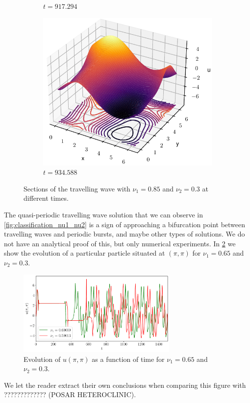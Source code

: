 \documentclass[twoside]{article}
\begin{document}
\begin{figure}[ht]
\begin{subfigure}[b]{0.32\textwidth}
    \caption{$t=917.294$}
  \end{subfigure}\hfill
  \begin{subfigure}[b]{0.32\textwidth}
    \includegraphics[width=\textwidth]{images/slice_nu1_0.85_nu2_0.3_time_934.588.pdf}
    \caption{$t=934.588$}
  \end{subfigure}
  \caption{Sections of the travelling wave with $\nu_1=0.85$ and $\nu_2=0.3$ at different times.}
  \label{fig:sections_tw}
\end{figure}
The quasi-periodic travelling wave solution that we can observe in \cref{fig:classification_nu1_nu2} is a sign of approaching a bifurcation point between travelling waves and periodic bursts, and maybe other types of solutions. We do not have an analytical proof of this, but only numerical experiments. In \cref{fig:qp_tw} we show the evolution of a particular particle situated at $(\pi,\pi)$ for $\nu_1=0.65$ and $\nu_2=0.3$.

\begin{figure}[ht]
  \centering
  \includegraphics[width=0.7\textwidth]{images/qp_tw.pdf}
  \caption{Evolution of $u(\pi,\pi)$ as a function of time for $\nu_1=0.65$ and $\nu_2=0.3$.}
  \label{fig:qp_tw}
\end{figure}
We let the reader extract their own conclusions when comparing this figure with ????????????? (POSAR HETEROCLINIC).
\end{document}
